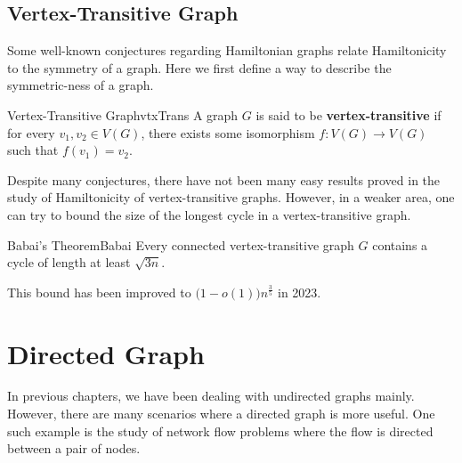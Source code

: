 \documentclass[math]{amznotes}
\theoremstyle{remark}
\newcommand{\0}{\mathbf{0}}
\newcommand{\1}{\mathbf{1}}
\begin{document}
\section{Vertex-Transitive Graph}
Some well-known conjectures regarding Hamiltonian graphs relate Hamiltonicity to the symmetry of a graph. Here we first define a way to describe the symmetric-ness of a graph.
\begin{dfnbox}{Vertex-Transitive Graph}{vtxTrans}
    A graph $G$ is said to be {\color{red} \textbf{vertex-transitive}} if for every $v_1, v_2 \in V(G)$, there exists some isomorphism $f \colon V(G) \to V(G)$ such that $f(v_1) = v_2$.
\end{dfnbox}
Despite many conjectures, there have not been many easy results proved in the study of Hamiltonicity of vertex-transitive graphs. However, in a weaker area, one can try to bound the size of the longest cycle in a vertex-transitive graph.
\begin{thmbox}{Babai's Theorem}{Babai}
    Every connected vertex-transitive graph $G$ contains a cycle of length at least $\sqrt{3n}$.
\end{thmbox}
This bound has been improved to $\bigl(1 - o(1)\bigr)n^{\frac{3}{5}}$ in 2023.
\chapter{Directed Graph}
In previous chapters, we have been dealing with undirected graphs mainly. However, there are many scenarios where a directed graph is more useful. One such example is the study of network flow problems where the flow is directed between a pair of nodes.
\end{document}
